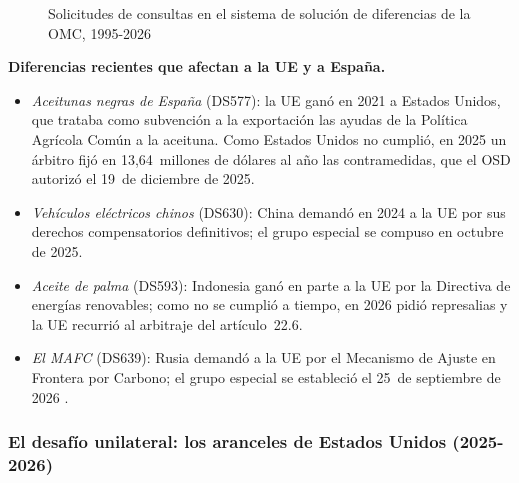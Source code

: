 \documentclass[11pt]{article}
\begin{document}
\begin{figure}[H]
\centering
\caption{Solicitudes de consultas en el sistema de solución de diferencias de la OMC, 1995-2026}\label{fig:diferencias}
\end{figure}

\begin{anotaciones}
\textbf{Diferencias recientes que afectan a la UE y a España.}
\begin{itemize}
\item \emph{Aceitunas negras de España} (DS577): la UE ganó en 2021 a Estados Unidos, que trataba como subvención a la exportación las ayudas de la Política Agrícola Común a la aceituna. Como Estados Unidos no cumplió, en 2025 un árbitro fijó en 13,64~millones de dólares al año las contramedidas, que el OSD autorizó el 19~de diciembre de 2025\nocite{OMC2025DS577Arbitraje}.
\item \emph{Vehículos eléctricos chinos} (DS630): China demandó en 2024 a la UE por sus derechos compensatorios definitivos; el grupo especial se compuso en octubre de 2025.
\item \emph{Aceite de palma} (DS593): Indonesia ganó en parte a la UE por la Directiva de energías renovables; como no se cumplió a tiempo, en 2026 pidió represalias y la UE recurrió al arbitraje del artículo~22.6.
\item \emph{El MAFC} (DS639): Rusia demandó a la UE por el Mecanismo de Ajuste en Frontera por Carbono; el grupo especial se estableció el 25~de septiembre de 2026 .
\end{itemize}
\end{anotaciones}

\subsubsection{El desafío unilateral:\cortetitulo{} los aranceles de Estados Unidos (2025-2026)}\label{sec:unilateralismo}
\end{document}
